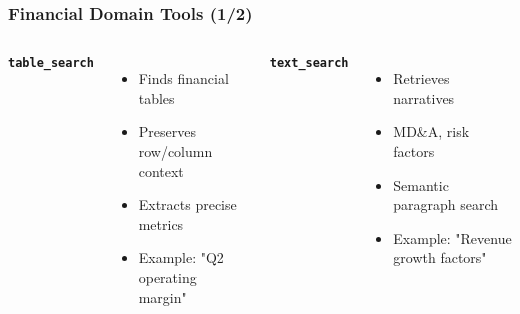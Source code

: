 \begin{frame}
    \frametitle{Financial Domain Tools (1/2)}
    
    \begin{columns}
        \textbf{\texttt{table\_search}}
        \begin{itemize}
            \item Finds financial tables
            \item Preserves row/column context
            \item Extracts precise metrics
            \item Example: "Q2 operating margin"
        \end{itemize}
        
        \textbf{\texttt{text\_search}}
        \begin{itemize}
            \item Retrieves narratives
            \item MD\&A, risk factors
            \item Semantic paragraph search
            \item Example: "Revenue growth factors"
        \end{itemize}
    \end{columns}
\end{frame}

